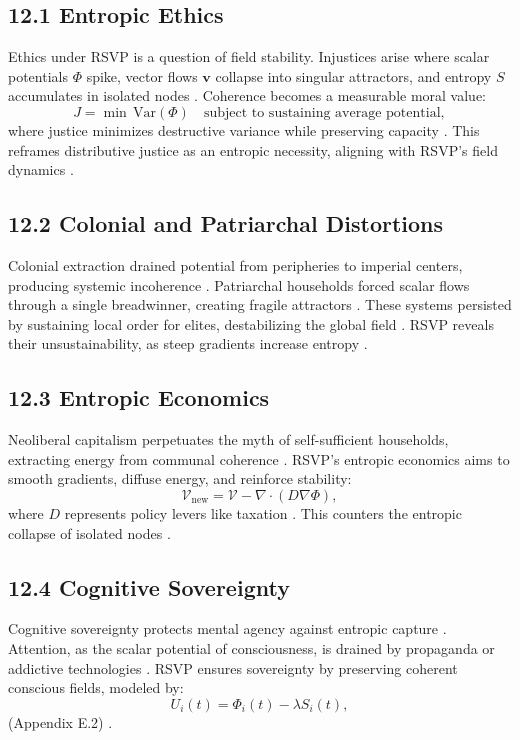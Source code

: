\documentclass[12pt]{article}
\begin{document}
\subsection*{12.1 Entropic Ethics}
Ethics under RSVP is a question of field stability. Injustices arise where scalar potentials \(\Phi\) spike, vector flows \(\mathbf{v}\) collapse into singular attractors, and entropy \(S\) accumulates in isolated nodes \citep{shannon1948}. Coherence becomes a measurable moral value:
\[
J = \min \, \mathrm{Var}(\Phi) \quad \text{subject to sustaining average potential},
\]
where justice minimizes destructive variance while preserving capacity \citep{whitehead1978}. This reframes distributive justice as an entropic necessity, aligning with RSVP's field dynamics \citep{gromov1999}.
\subsection*{12.2 Colonial and Patriarchal Distortions}
Colonial extraction drained potential from peripheries to imperial centers, producing systemic incoherence \citep{ortega1957}. Patriarchal households forced scalar flows through a single breadwinner, creating fragile attractors \citep{zuboff2019}. These systems persisted by sustaining local order for elites, destabilizing the global field \citep{deleuze1987}. RSVP reveals their unsustainability, as steep gradients increase entropy \citep{jaynes2003}.
\subsection*{12.3 Entropic Economics}
Neoliberal capitalism perpetuates the myth of self-sufficient households, extracting energy from communal coherence \citep{zuboff2019}. RSVP's entropic economics aims to smooth gradients, diffuse energy, and reinforce stability:
\[
\mathcal{V}_{\text{new}} = \mathcal{V} - \nabla \cdot (D \nabla \Phi),
\]
where \(D\) represents policy levers like taxation \citep{cover2006}. This counters the entropic collapse of isolated nodes \citep{lanier2018}.
\subsection*{12.4 Cognitive Sovereignty}
Cognitive sovereignty protects mental agency against entropic capture \citep{ortega1957}. Attention, as the scalar potential of consciousness, is drained by propaganda or addictive technologies \citep{lanier2018}. RSVP ensures sovereignty by preserving coherent conscious fields, modeled by:
\[
U_i(t) = \Phi_i(t) - \lambda S_i(t),
\]
(Appendix E.2) \citep{hanson2003}.
\end{document}
